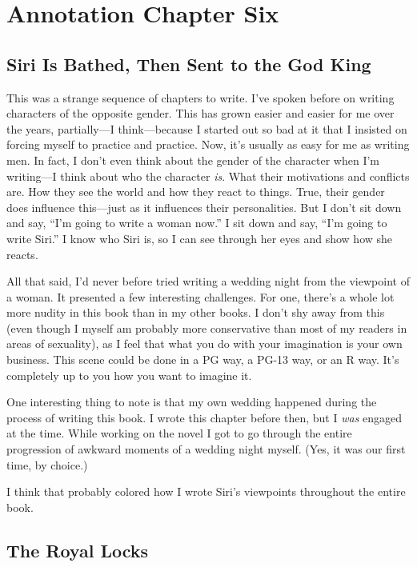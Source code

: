 \section{Annotation Chapter Six}

\subsection*{Siri Is Bathed, Then Sent to the God King}

This was a strange sequence of chapters to write. I’ve spoken before on writing characters of the opposite gender. This has grown easier and easier for me over the years, partially—I think—because I started out so bad at it that I insisted on forcing myself to practice and practice. Now, it’s usually as easy for me as writing men. In fact, I don’t even think about the gender of the character when I’m writing—I think about who the character \textit{is}. What their motivations and conflicts are. How they see the world and how they react to things. True, their gender does influence this—just as it influences their personalities. But I don’t sit down and say, “I’m going to write a woman now.” I sit down and say, “I’m going to write Siri.” I know who Siri is, so I can see through her eyes and show how she reacts.

All that said, I’d never before tried writing a wedding night from the viewpoint of a woman. It presented a few interesting challenges. For one, there’s a whole lot more nudity in this book than in my other books. I don’t shy away from this (even though I myself am probably more conservative than most of my readers in areas of sexuality), as I feel that what you do with your imagination is your own business. This scene could be done in a PG way, a PG-13 way, or an R way. It’s completely up to you how you want to imagine it.

One interesting thing to note is that my own wedding happened during the process of writing this book. I wrote this chapter before then, but I \textit{was} engaged at the time. While working on the novel I got to go through the entire progression of awkward moments of a wedding night myself. (Yes, it was our first time, by choice.)

I think that probably colored how I wrote Siri’s viewpoints throughout the entire book.

\subsection*{The Royal Locks}

